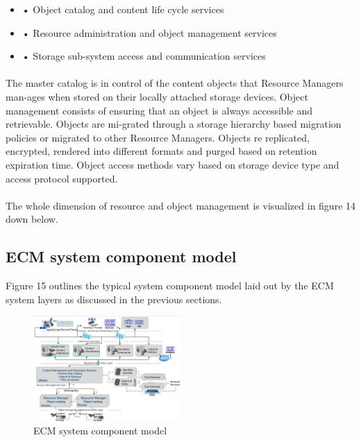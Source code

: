 \documentclass[EPiC]{easychair} %
\begin{document}
\begin{itemize}
    \item •	Object catalog and content life cycle services 
    \item •	Resource administration and object management services
    \item •	Storage sub-system access and communication services
\end{itemize}

    \paragraph{} The master catalog is in control of the content objects that Resource Managers man-ages when stored on their locally attached storage devices. Object management consists of ensuring that an object is always accessible and retrievable. Objects are mi-grated through a storage hierarchy based migration policies or migrated to other Resource Managers. Objects re replicated, encrypted, rendered into different formats and purged based on retention expiration time. Object access methods vary based on storage device type and access protocol supported.
    
    \paragraph{} The whole dimension of resource and object management is visualized in figure 14 down below.

\subsection{ ECM system component model}

Figure 15 outlines the typical system component model laid out by the ECM system layers as discussed in the previous sections.

\begin{figure}[hbt!]
	\begin{centering}
	\includegraphics[width=0.5\textwidth]{pics/ECMpic15}
	\caption{ECM system component model}
	\label{fig:ecm-model-componets}
	\end{centering}
\end{figure}
\end{document}
